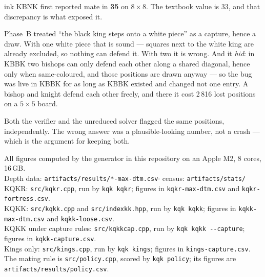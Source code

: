 \documentclass[11pt]{article}
\begin{document}
\begin{result}[title={The bug that mattered}]{ink}
KBNK first reported mate in \textbf{35} on $8\times8$. The textbook value is 33,
and that discrepancy is what exposed it.

Phase~B treated ``the black king steps onto a white piece'' as a capture, hence
a draw. With one white piece that is sound --- squares next to the white king
are already excluded, so nothing can defend it. With two it is wrong. And it
\emph{hid}: in KBBK two bishops can only defend each other along a shared
diagonal, hence only when same-coloured, and those positions are drawn anyway
--- so the bug was live in KBBK for as long as KBBK existed and changed not one
entry. A bishop and knight defend each other freely, and there it cost 2\,816
lost positions on a $5\times5$ board.

\smallskip
Both the verifier and the unreduced solver flagged the same positions,
independently. The wrong answer was a plausible-looking number, not a crash ---
which is the argument for keeping both.
\end{result}

\vfill
\begin{center}\small\color{inksoft}
All figures computed by the generator in this repository on an Apple M2,
8 cores, 16\,GB.\\
Depth data: \texttt{artifacts/results/*-max-dtm.csv}\quad$\cdot$\quad
census: \texttt{artifacts/stats/}\\
KQKR: \texttt{src/kqkr.cpp}, run by \texttt{kqk kqkr}; figures in
\texttt{kqkr-max-dtm.csv} and \texttt{kqkr-fortress.csv}.\\
KQKK: \texttt{src/kqkk.cpp} and \texttt{src/indexkk.hpp}, run by
\texttt{kqk kqkk}; figures in \texttt{kqkk-max-dtm.csv} and
\texttt{kqkk-loose.csv}.\\
KQKK under capture rules: \texttt{src/kqkkcap.cpp}, run by
\texttt{kqk kqkk -{}-capture}; figures in \texttt{kqkk-capture.csv}.\\
Kings only: \texttt{src/kings.cpp}, run by \texttt{kqk kings}; figures in
\texttt{kings-capture.csv}.\\
The mating rule is \texttt{src/policy.cpp}, scored by \texttt{kqk policy};
its figures are \texttt{artifacts/results/policy.csv}.
\end{center}
\end{document}
